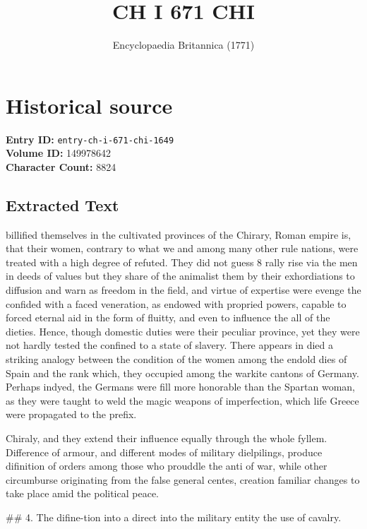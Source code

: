 \documentclass{article}
\title{CH I 671 CHI}
\date{Encyclopaedia Britannica (1771)}
\begin{document}
\maketitle

\section*{Historical source}
\textbf{Entry ID:} \texttt{entry-ch-i-671-chi-1649} \\
\textbf{Volume ID:} 149978642 \\
\textbf{Character Count:} 8824

\subsection*{Extracted Text}
billified themselves in the cultivated provinces of the Chirary, Roman empire is, that their women, contrary to what we and among many other rule nations, were treated with a high degree of refuted. They did not guess 8 rally rise via the men in deeds of values but they share of the animalist them by their exhordiations to diffusion and warn as freedom in the field, and virtue of expertise were evenge the confided with a faced veneration, as endowed with propried powers, capable to forced eternal aid in the form of fluitty, and even to influence the all of the dieties. Hence, though domestic duties were their peculiar province, yet they were not hardly tested the confined to a state of slavery. There appears in died a striking analogy between the condition of the women among the endold dies of Spain and the rank which, they occupied among the warkite cantons of Germany. Perhaps indyed, the Germans were fill more honorable than the Spartan woman, as they were taught to weld the magic weapons of imperfection, which life Greece were propagated to the prefix.

Chiraly, and they extend their influence equally through the whole fyllem. Difference of armour, and different modes of military dielpilings, produce difinition of orders among those who prouddle the anti of war, while other circumburse originating from the false general centes, creation familiar changes to take place amid the political peace.

\#\# 4. The difine-tion into a direct into the military entity the use of cavalry.
\end{document}
